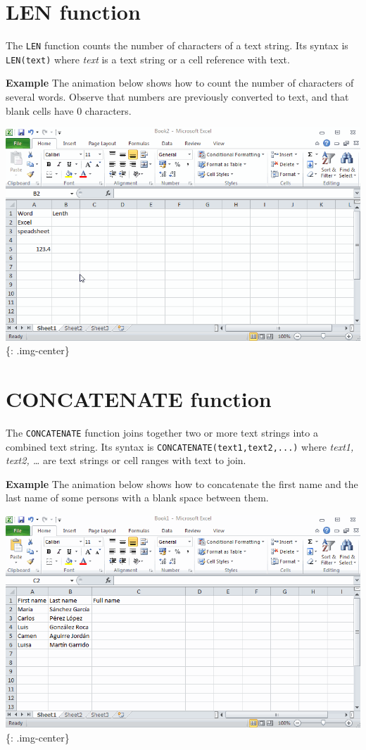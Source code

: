 \section{LEN function}
\label{lenfunction}

The \texttt{LEN} function counts the number of characters of a text string. Its syntax is \texttt{LEN(text)} where \emph{text} is a text string or a cell reference with text.

\textbf{Example} The animation below shows how to count the number of characters of several words. Observe that numbers are previously converted to text, and that blank cells have 0 characters.

\includegraphics[keepaspectratio,width=\textwidth,height=0.75\textheight]{img/example_function_len.gif}
\{: .img-center\}

\section{CONCATENATE function}
\label{concatenatefunction}

The \texttt{CONCATENATE} function joins together two or more text strings into a combined text string. Its syntax is \texttt{CONCATENATE(text1,text2,...)} where \emph{text1, text2, {\ldots}} are text strings or cell ranges with text to join.

\textbf{Example} The animation below shows how to concatenate the first name and the last name of some persons with a blank space between them.

\includegraphics[keepaspectratio,width=\textwidth,height=0.75\textheight]{img/example_function_concatenate.gif}
\{: .img-center\}

